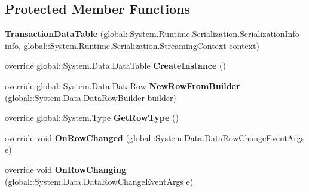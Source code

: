 \subsection*{Protected Member Functions}
\begin{DoxyCompactItemize}
\item 
{\bfseries Transaction\+Data\+Table} (global\+::\+System.\+Runtime.\+Serialization.\+Serialization\+Info info, global\+::\+System.\+Runtime.\+Serialization.\+Streaming\+Context context)\hypertarget{class_products_1_1_data_1_1ds_sage_1_1_transaction_data_table_a1ac24e900b67272a9edf2c53934e8bf6}{}\label{class_products_1_1_data_1_1ds_sage_1_1_transaction_data_table_a1ac24e900b67272a9edf2c53934e8bf6}

\item 
override global\+::\+System.\+Data.\+Data\+Table {\bfseries Create\+Instance} ()\hypertarget{class_products_1_1_data_1_1ds_sage_1_1_transaction_data_table_ad0aff1652a0e731a9955469b0c24e90c}{}\label{class_products_1_1_data_1_1ds_sage_1_1_transaction_data_table_ad0aff1652a0e731a9955469b0c24e90c}

\item 
override global\+::\+System.\+Data.\+Data\+Row {\bfseries New\+Row\+From\+Builder} (global\+::\+System.\+Data.\+Data\+Row\+Builder builder)\hypertarget{class_products_1_1_data_1_1ds_sage_1_1_transaction_data_table_aa003262628638fe7e771766b3d2d7816}{}\label{class_products_1_1_data_1_1ds_sage_1_1_transaction_data_table_aa003262628638fe7e771766b3d2d7816}

\item 
override global\+::\+System.\+Type {\bfseries Get\+Row\+Type} ()\hypertarget{class_products_1_1_data_1_1ds_sage_1_1_transaction_data_table_a97003712a5100aa2c9cb84877b0edf8d}{}\label{class_products_1_1_data_1_1ds_sage_1_1_transaction_data_table_a97003712a5100aa2c9cb84877b0edf8d}

\item 
override void {\bfseries On\+Row\+Changed} (global\+::\+System.\+Data.\+Data\+Row\+Change\+Event\+Args e)\hypertarget{class_products_1_1_data_1_1ds_sage_1_1_transaction_data_table_abed26d35a1090dbd4f6badd006e9d9d3}{}\label{class_products_1_1_data_1_1ds_sage_1_1_transaction_data_table_abed26d35a1090dbd4f6badd006e9d9d3}

\item 
override void {\bfseries On\+Row\+Changing} (global\+::\+System.\+Data.\+Data\+Row\+Change\+Event\+Args e)\hypertarget{class_products_1_1_data_1_1ds_sage_1_1_transaction_data_table_a0bffa54e522a9c5c16686d47c639d727}{}\label{class_products_1_1_data_1_1ds_sage_1_1_transaction_data_table_a0bffa54e522a9c5c16686d47c639d727}


\end{DoxyCompactItemize}

